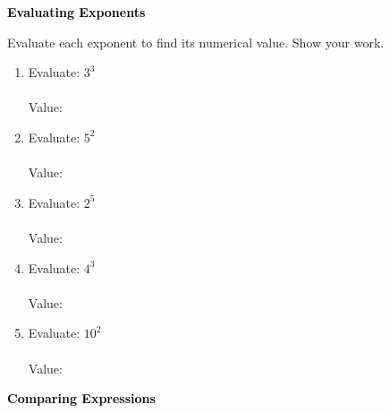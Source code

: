 \documentclass[12pt, letterpaper, fleqn]{article}
\newcommand{\blanklong}{\underline{\hspace{6.5cm}}}
\begin{document}
\newpage

\begin{tcolorbox}[colback=black!10]
\large\textcolor{black}{\textbf{Evaluating Exponents}}
\end{tcolorbox}

\noindent
Evaluate each exponent to find its numerical value. Show your work.

\vspace{3mm}

\begin{enumerate}[itemsep=1cm, leftmargin=0.6cm]

\item Evaluate: $3^3$ \\ \\
Value: \blanklong

\vspace{1cm}

\item Evaluate: $5^2$ \\ \\
Value: \blanklong

\vspace{1cm}

\item Evaluate: $2^5$ \\ \\
Value: \blanklong

\vspace{1cm}

\item Evaluate: $4^3$ \\ \\
Value: \blanklong

\vspace{1cm}

\item Evaluate: $10^2$ \\ \\
Value: \blanklong

\vspace{1cm}

\end{enumerate}

\newpage

\begin{tcolorbox}[colback=black!10]
\large\textcolor{black}{\textbf{Comparing Expressions}}
\end{tcolorbox}
\end{document}
